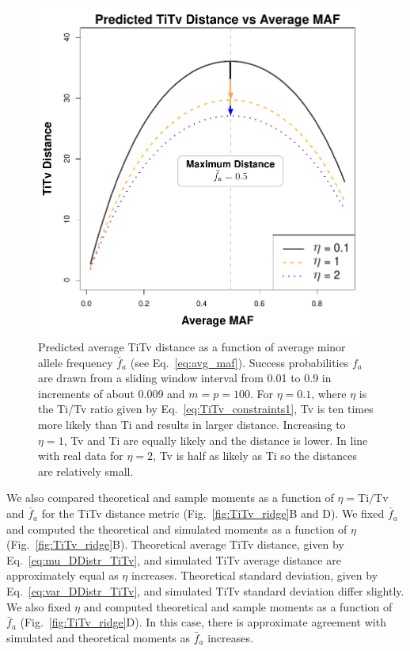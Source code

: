 \documentclass[aoas]{imsart}
\begin{document}
\begin{figure}[H]
\begin{minipage}[c]{0.65\textwidth}
	\includegraphics[width=0.98\textwidth]{TiTv_distance-vs-maf.pdf}
\end{minipage}\hfill
\begin{minipage}[c]{0.35\textwidth}
	\caption{Predicted average TiTv distance as a function of average minor allele frequency $\bar{f}_a$ (see Eq.~\ref{eq:avg_maf}). Success probabilities $f_a$ are drawn from a sliding window interval from 0.01 to 0.9 in increments of about 0.009 and $m=p=100$. For $\eta=0.1$, where $\eta$ is the Ti/Tv ratio given by Eq.~\ref{eq:TiTv_constraints1}, Tv is ten times more likely than Ti and results in larger distance. Increasing to $\eta=1$, Tv and Ti are equally likely and the distance is lower.  In line with real data for $\eta=2$, Tv is half as likely as Ti so the distances are relatively small.}\label{fig:TiTv-vs-maf}
\end{minipage}
\end{figure}

We also compared theoretical and sample moments as a function of $\eta = \text{Ti/Tv}$ and $\bar{f}_a$ for the TiTv distance metric (Fig.~\ref{fig:TiTv_ridge}B and D). We fixed $\bar{f}_a$ and computed the theoretical and simulated moments as a function of $\eta$ (Fig.~\ref{fig:TiTv_ridge}B). Theoretical average TiTv distance, given by Eq.~\ref{eq:mu_DDistr_TiTv}, and simulated TiTv average distance are approximately equal as $\eta$ increases. Theoretical standard deviation, given by Eq.~\ref{eq:var_DDistr_TiTv}, and simulated TiTv standard deviation differ slightly. We also fixed $\eta$ and computed theoretical and sample moments as a function of $\bar{f}_a$ (Fig.~\ref{fig:TiTv_ridge}D). In this case, there is approximate agreement with simulated and theoretical moments as $\bar{f}_a$ increases.
\end{document}
